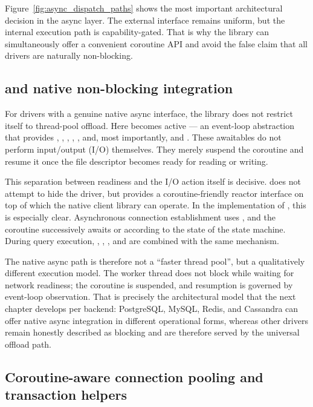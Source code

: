 Figure~\ref{fig:async_dispatch_paths} shows the most important architectural decision in the async layer. The external interface remains uniform, but the internal execution path is capability-gated. That is why the library can simultaneously offer a convenient coroutine API and avoid the false claim that all drivers are naturally non-blocking.

\subsection{ and native non-blocking integration}

For drivers with a genuine native async interface, the library does not restrict itself to thread-pool offload. Here  becomes active --- an event-loop abstraction that provides , , , , , and, most importantly,  and . These awaitables do not perform input/output (I/O) themselves. They merely suspend the coroutine and resume it once the file descriptor becomes ready for reading or writing.

This separation between readiness and the I/O action itself is decisive.  does not attempt to hide the driver, but provides a coroutine-friendly reactor interface on top of which the native client library can operate. In the implementation of , this is especially clear. Asynchronous connection establishment uses , and the coroutine successively awaits  or  according to the state of the  state machine. During query execution, , , , and  are combined with the same  mechanism.

The native async path is therefore not a “faster thread pool”, but a qualitatively different execution model. The worker thread does not block while waiting for network readiness; the coroutine is suspended, and resumption is governed by event-loop observation. That is precisely the architectural model that the next chapter develops per backend: PostgreSQL, MySQL, Redis, and Cassandra can offer native async integration in different operational forms, whereas other drivers remain honestly described as blocking and are therefore served by the universal offload path.

\subsection{Coroutine-aware connection pooling and transaction helpers}

